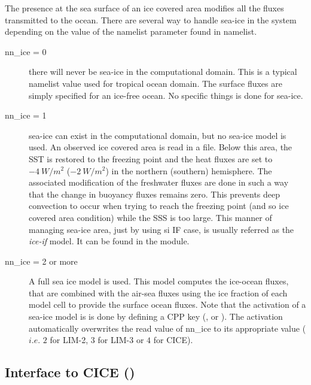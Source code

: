 \documentclass[NEMO_book]{subfiles}
\begin{document}
The presence at the sea surface of an ice covered area modifies all the fluxes 
transmitted to the ocean. There are several way to handle sea-ice in the system 
depending on the value of the  namelist parameter found in  namelist.  
\begin{description}
\item[nn{\_}ice = 0]  there will never be sea-ice in the computational domain. 
This is a typical namelist value used for tropical ocean domain. The surface fluxes 
are simply specified for an ice-free ocean. No specific things is done for sea-ice.
\item[nn{\_}ice = 1]  sea-ice can exist in the computational domain, but no sea-ice model 
is used. An observed ice covered area is read in a file. Below this area, the SST is 
restored to the freezing point and the heat fluxes are set to $-4~W/m^2$ ($-2~W/m^2$) 
in the northern (southern) hemisphere. The associated modification of the freshwater 
fluxes are done in such a way that the change in buoyancy fluxes remains zero. 
This prevents deep convection to occur when trying to reach the freezing point 
(and so ice covered area condition) while the SSS is too large. This manner of 
managing sea-ice area, just by using si IF case, is usually referred as the \textit{ice-if} 
model. It can be found in the  module.
\item[nn{\_}ice = 2 or more]  A full sea ice model is used. This model computes the 
ice-ocean fluxes, that are combined with the air-sea fluxes using the ice fraction of 
each model cell to provide the surface ocean fluxes. Note that the activation of a 
sea-ice model is is done by defining a CPP key (,  or ). 
The activation automatically overwrites the read value of nn{\_}ice to its appropriate 
value ($i.e.$ $2$ for LIM-2, $3$ for LIM-3 or $4$ for CICE).
\end{description}


\subsection   [Interface to CICE (\textit{sbcice\_cice})]
			{Interface to CICE ()}
\label{SBC_cice}
\end{document}
